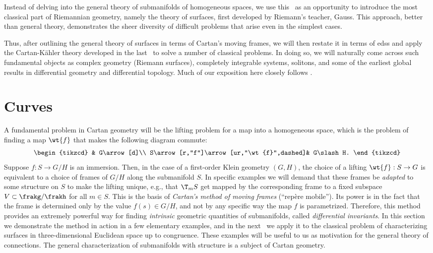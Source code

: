 Instead of delving into the general theory of submanifolds of homogeneous spaces, we use this \chap\ as an opportunity to introduce the most classical part of Riemannian geometry, namely the theory of surfaces, first developed by Riemann's teacher, Gauss. This approach, better than general theory, demonstrates the sheer diversity of difficult problems that arise even in the simplest cases.

Thus, after outlining the general theory of surfaces in terms of Cartan's moving frames, we will then restate it in terms of \glspl{eds} and apply the Cartan-K\"ahler theory developed in the last \chap\ to solve a number of classical problems. In doing so, we will naturally come across such fundamental objects as complex geometry (Riemann surfaces), completely integrable systems, solitons, and some of the earliest global results in differential geometry and differential topology. Much of our exposition here closely follows \cite{Ivey}.




\section{Curves}

A fundamental problem in Cartan geometry will be the lifting problem for a map into a homogeneous space, which is the problem of finding a map $\wt{f}$ that makes the following diagram commute:
\[\begin{tikzcd}
                                    & G\arrow[d]\\
    S\arrow[r,"f"]\arrow[ur,"\wt{f}",dashed]& G\slash H.
\end{tikzcd}\]
Suppose $f:S\to G\slash H$ is an immersion. Then, in the case of a first-order Klein geometry $(G,H)$, the choice of a lifting $\wt{f}:S\to G$ is equivalent to a choice of frames of $G\slash H$ along the submanifold $S$. In specific examples we will demand that these frames be \emph{adapted} to some structure on $S$ to make the lifting unique, e.g., that $\T_mS$ get mapped by the corresponding frame to a fixed subspace $V\subset \frakg\slash\frakh$ for all $m\in S$. This is the basis of \emph{Cartan's method of moving frames} (``rep\`ere mobile''). Its power is in the fact that the frame is determined only by the value $f(s)\in G\slash H$, and not by any specific way the map $f$ is parametrized. Therefore, this method provides an extremely powerful way for finding \emph{intrinsic} geometric quantities of submanifolds, called \emph{differential invariants}. In this section we demonstrate the method in action in a few elementary examples, and in the next \sect\ we apply it to the classical problem of characterizing surfaces in three-dimensional Euclidean space up to congruence. These examples will be useful to us as motivation for the general theory of connections. The general characterization of submanifolds with structure is a subject of Cartan geometry.

